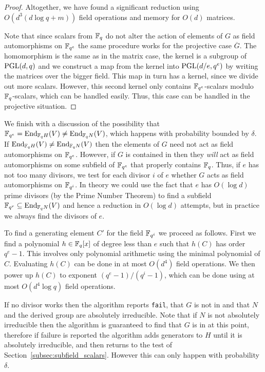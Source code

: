 \begin{proof}
Altogether, we have found a significant reduction 
using $O(d^3(d\log q +m))$ field operations and memory for $O(d)$ matrices.


Note that since scalars from $\mathbb{F}_q$ do not alter the
action of elements of $G$ as field automorphisms on $\mathbb{F}_{q^e}$ the
same procedure works for the projective case $\overline{G}$.
The homomorphism is the same as in the matrix case, the kernel 
is a subgroup of $\PGL(d,q)$ and we construct a map from the kernel into
$\PGL(d/e,q^e)$ by writing the matrices over the bigger field. This
map in turn has a kernel, since we divide out more scalars. However, this
second kernel only contains $\mathbb{F}_{q^e}$-scalars modulo
$\mathbb{F}_q$-scalars, which can be handled easily. Thus, this case can
be handled in the projective situation.
\end{proof}

We finish with a discussion of the possibility that 
$\F_{q^e} = \End_{\F_q H}(V) \neq \End_{\F_q N}(V)$, which happens 
with probability bounded by $\delta$. 
If  $\End_{\F_q H}(V) \neq \End_{\F_q N}(V)$ then the elements 
of $G$ need not
act as field automorphisms on $\mathbb{F}_{q^e}$. However, if $G$ is contained in 
 then they
\emph{will} act as field automorphisms on some subfield of $\mathbb{F}_{q^e}$
that properly contains $\mathbb{F}_q$. Thus, if $e$ has not too many divisors,
we test for each divisor $i$ of $e$ whether $G$ acts as field automorphisms
on $\mathbb{F}_{q^i}$.
In theory we could use the fact that $e$ has  $O(\log d)$ prime divisors 
(by the Prime Number Theorem) to 
find a subfield $\F_{q^r} \subseteq \End_{\F_q N}(V)$ and hence a reduction
 in 
$O(\log d)$ attempts, but in practice we always find the divisors of $e$.

To find a generating element $C'$ for the field $\mathbb{F}_{q^i}$ we proceed
as follows. First we find a polynomial $h \in \mathbb{F}_q[x]$ of degree less
than $e$ such that $h(C)$ has order $q^e-1$. This involves only
polynomial arithmetic using the minimal polynomial of $C$. Evaluating
$h(C)$ can be done in at most $O(d^4)$ field operations. We then
power up $h(C)$ to exponent $(q^e-1)/(q^i-1)$, which can be done
using at most $O(d^4 \log q)$ field operations.

If no divisor works
then the algorithm reports {\tt fail}, that $G$ is not in  and 
that $N$ and the derived group are absolutely irreducible. Note that if
$N$ is not absolutely irreducible then the algorithm is guaranteed to
find that $G$ is in  at this point, therefore if failure is reported
the algorithm adds generators to $H$ until it is absolutely irreducible,
and then returns to the test of Section~\ref{subsec:subfield_scalars}.
However this can only happen with probability $\delta$.



